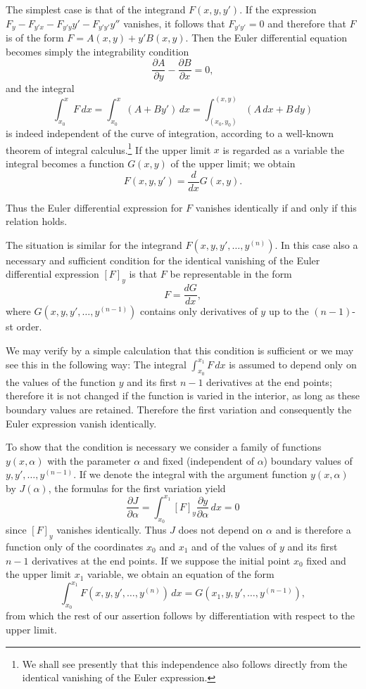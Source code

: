 The simplest case is that of the integrand $F(x,y,y')$. If the expression $F_y-F_{y'x}-F_{y'y}y'-F_{y'y'}y''$ vanishes, it follows that $F_{y'y'}=0$ and therefore that $F$ is of the form $F=A(x,y)+y'B(x,y)$. Then the Euler differential equation becomes simply the integrability condition
\[
\frac{\partial A}{\partial y}-\frac{\partial B}{\partial x}=0,
\]
and the integral
\[
\int_{x_0}^{x}F\,dx=\int_{x_0}^{x}(A+By')\,dx
=\int_{(x_0,y_0)}^{(x,y)}(A\,dx+B\,dy)
\]
is indeed independent of the curve of integration, according to a well-known theorem of integral calculus.\footnote{We shall see presently that this independence also follows directly from the identical vanishing of the Euler expression.} If the upper limit $x$ is regarded as a variable the integral becomes a function $G(x,y)$ of the upper limit; we obtain
\[
F(x,y,y')=\frac{d}{dx}G(x,y).
\]

Thus the Euler differential expression for $F$ vanishes identically if and only if this relation holds.

The situation is similar for the integrand $F(x,y,y',\ldots,y^{(n)})$. In this case also a necessary and sufficient condition for the identical vanishing of the Euler differential expression $[F]_y$ is that $F$ be representable in the form
\[
F=\frac{dG}{dx},
\]
where $G(x,y,y',\ldots,y^{(n-1)})$ contains only derivatives of $y$ up to the $(n-1)$-st order.

We may verify by a simple calculation that this condition is sufficient or we may see this in the following way: The integral $\int_{x_0}^{x_1}F\,dx$ is assumed to depend only on the values of the function $y$ and its first $n-1$ derivatives at the end points; therefore it is not changed if the function is varied in the interior, as long as these boundary values are retained. Therefore the first variation and consequently the Euler expression vanish identically.

To show that the condition is necessary we consider a family of functions $y(x,\alpha)$ with the parameter $\alpha$ and fixed (independent of $\alpha$) boundary values of $y,y',\ldots,y^{(n-1)}$. If we denote the integral with the argument function $y(x,\alpha)$ by $J(\alpha)$, the formulas for the first variation yield
\[
\frac{\partial J}{\partial\alpha}=\int_{x_0}^{x_1}[F]_y\frac{\partial y}{\partial\alpha}\,dx=0
\]
since $[F]_y$ vanishes identically. Thus $J$ does not depend on $\alpha$ and is therefore a function only of the coordinates $x_0$ and $x_1$ and of the values of $y$ and its first $n-1$ derivatives at the end points. If we suppose the initial point $x_0$ fixed and the upper limit $x_1$ variable, we obtain an equation of the form
\[
\int_{x_0}^{x_1}F(x,y,y',\ldots,y^{(n)})\,dx
=G(x_1,y,y',\ldots,y^{(n-1)}),
\]
from which the rest of our assertion follows by differentiation with respect to the upper limit.

